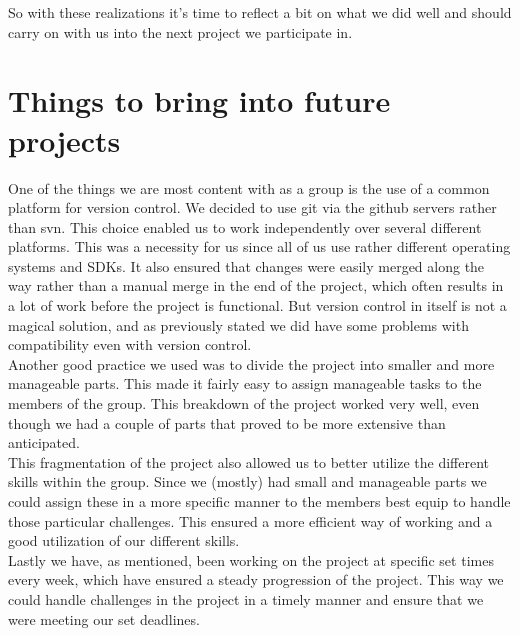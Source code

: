 So with these realizations it's time to reflect a bit on what we did well and should carry on with us into the next project we participate in.

\section{Things to bring into future projects}
One of the things we are most content with as a group is the use of a common platform for version control. We decided to use git via the github servers rather than svn. This choice enabled us to work independently over several different platforms. This was a necessity for us since all of us use rather different operating systems and SDKs. It also ensured that changes were easily merged along the way rather than a manual merge in the end of the project, which often results in a lot of work before the project is functional. But version control in itself is not a magical solution, and as previously stated we did have some problems with compatibility even with version control. \\
Another good practice we used was to divide the project into smaller and more manageable parts. This made it fairly easy to assign manageable tasks to the members of the group. This breakdown of the project worked very well, even though we had a couple of parts that proved to be more extensive than anticipated. \\
This fragmentation of the project also allowed us to better utilize the different skills within the group. Since we (mostly) had small and manageable parts we could assign these in a more specific manner to the members best equip to handle those particular challenges. This ensured a more efficient way of working and a good utilization of our different skills. \\
Lastly we have, as mentioned, been working on the project at specific set times every week, which have ensured a steady progression of the project. This way we could handle challenges in the project in a timely manner and  ensure that we were meeting our set deadlines.


